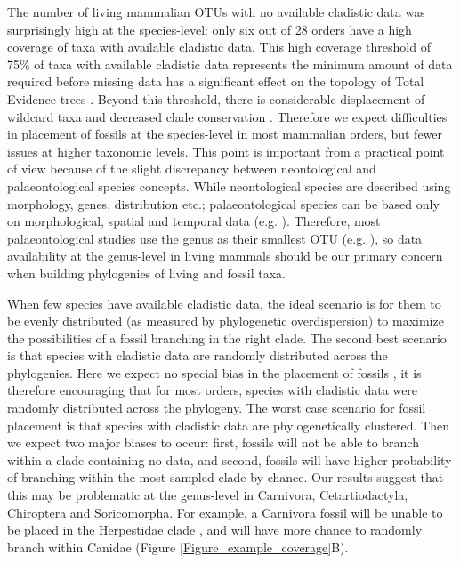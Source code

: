 \documentclass[12pt,letterpaper]{article}
\begin{document}
The number of living mammalian OTUs%
 with no available cladistic data was surprisingly high at the species-level: only six out of 28 orders have a high coverage of taxa with available cladistic data.
This high coverage threshold of 75\% of taxa with available cladistic data represents the minimum amount of data required before missing data has a significant effect on the topology of Total Evidence trees \cite{GuillermeCooper}.
Beyond this threshold, there is considerable displacement of wildcard taxa and decreased clade conservation \cite{GuillermeCooper}.
Therefore we expect difficulties in placement of fossils at the species-level in most mammalian orders, but fewer issues at higher taxonomic levels.
This point is important from a practical point of view because of the slight discrepancy between neontological and palaeontological species concepts.
While neontological species are described using morphology, genes, distribution etc.; palaeontological species can be based only on morphological, spatial and temporal data (e.g. \cite{ni2013oldest}).
Therefore, most palaeontological studies use the genus as their smallest OTU (e.g. \cite{ni2013oldest,O'Leary08022013}), so data availability at the genus-level in living mammals should be our primary concern when building phylogenies of living and fossil taxa.

When few species have available cladistic data, the ideal scenario is for them to be evenly distributed (as measured by phylogenetic overdispersion) to maximize the possibilities of a fossil branching in the right clade.
The second best scenario is that species with cladistic data are randomly distributed across the phylogenies. 
Here we expect no special bias in the placement of fossils \cite{GuillermeCooper}, it is therefore encouraging that for most orders, species with cladistic data were randomly distributed across the phylogeny.
The worst case scenario for fossil placement is that species with cladistic data are phylogenetically clustered. 
Then we expect two major biases to occur: first, fossils will not be able to branch within a clade containing no data, and second, fossils will have higher probability of branching within the most sampled clade by chance. 
Our results suggest that this may be problematic at the genus-level in Carnivora, Cetartiodactyla, Chiroptera and Soricomorpha. 
For example, a Carnivora fossil will be unable to be placed in the Herpestidae clade%
, and will have more chance to randomly branch within Canidae (Figure \ref{Figure_example_coverage}B).
\end{document}
